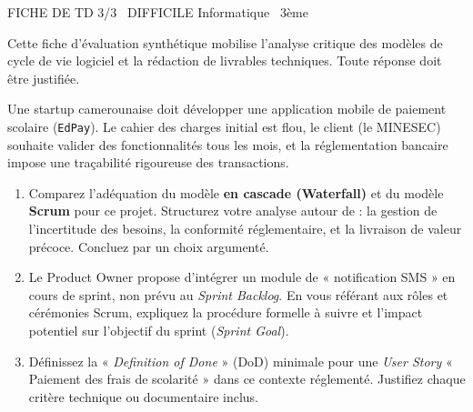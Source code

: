 \documentclass[11pt]{article}
\begin{document}
\begin{tcolorbox}[enhanced,colback=popink,colframe=popink,arc=10pt,boxrule=0pt,left=12pt,right=12pt,top=9pt,bottom=9pt]
{\color{white}\popxbold\small FICHE DE TD 3/3 \textbullet\ DIFFICILE \hfill Informatique \textbullet\ 3ème\par}
\end{tcolorbox}
\vspace{4pt}
\noindent Cette fiche d'évaluation synthétique mobilise l'analyse critique des modèles de cycle de vie logiciel et la rédaction de livrables techniques. Toute réponse doit être justifiée.

\begin{exercice}
Une startup camerounaise doit développer une application mobile de paiement scolaire (\texttt{EdPay}). Le cahier des charges initial est flou, le client (le MINESEC) souhaite valider des fonctionnalités tous les mois, et la réglementation bancaire impose une traçabilité rigoureuse des transactions.
\begin{enumerate}
    \item [2 pts] Comparez l'adéquation du modèle \textbf{en cascade (Waterfall)} et du modèle \textbf{Scrum} pour ce projet. Structurez votre analyse autour de : la gestion de l'incertitude des besoins, la conformité réglementaire, et la livraison de valeur précoce. Concluez par un choix argumenté.
    \item [2 pts] Le Product Owner propose d'intégrer un module de « notification SMS » en cours de sprint, non prévu au \textit{Sprint Backlog}. En vous référant aux rôles et cérémonies Scrum, expliquez la procédure formelle à suivre et l'impact potentiel sur l'objectif du sprint (\textit{Sprint Goal}).
    \item [2 pts] Définissez la « \textit{Definition of Done} » (DoD) minimale pour une \textit{User Story} « Paiement des frais de scolarité » dans ce contexte réglementé. Justifiez chaque critère technique ou documentaire inclus.
\end{enumerate}
\end{exercice}
\end{document}
